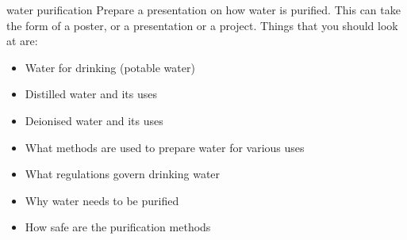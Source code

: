             \begin{project}{water purification}
            \nopagebreak
\label{m38138*id97324}
Prepare a presentation on how water is purified. This can take the form of a poster, or a presentation or a project. Things that you should look at are:
\label{m38138*id097324}\begin{itemize}[noitemsep]
            \item Water for drinking (potable water)\item Distilled water and its uses\item Deionised water and its uses\item What methods are used to prepare water for various uses\item What regulations govern drinking water\item Why water needs to be purified\item How safe are the purification methods\end{itemize}
\par 
\end{project}

